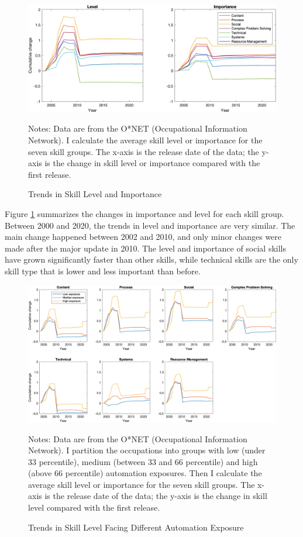 \documentclass[12pt]{article}
\begin{document}
\begin{figure}[h!]
\includegraphics[width = \textwidth]{trend}
\caption{Trends in Skill Level and Importance}
\label{trend}
{\scriptsize Notes: Data are from the O*NET (Occupational Information Network). I calculate the average skill level or importance for the seven skill groups. The x-axis is the release date of the data; the y-axis is the change in skill level or importance compared with the first release. }
\end{figure}

Figure \ref{trend} summarizes the changes in importance and level for each skill group. Between 2000 and 2020, the trends in level and importance are very similar. The main change happened between 2002 and 2010, and only minor changes were made after the major update in 2010. The level and importance of social skills have grown significantly faster than other skills, while technical skills are the only skill type that is lower and less important than before. 

\begin{figure}[h!]
\includegraphics[width = \textwidth]{LV_trend1}
\caption{Trends in Skill Level Facing Different Automation Exposure}
\label{LV_trend1}
{\scriptsize Notes: Data are from the O*NET (Occupational Information Network). I partition the occupations into groups with low (under 33 percentile), medium (between 33 and 66 percentile) and high (above 66 percentile) automation exposures. Then I calculate the average skill level or importance for the seven skill groups. The x-axis is the release date of the data; the y-axis is the change in skill level compared with the first release. }
\end{figure}
\end{document}
